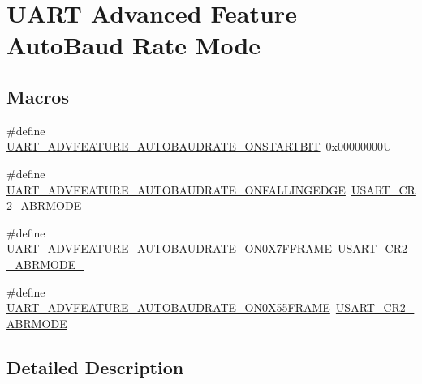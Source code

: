 \hypertarget{group___u_a_r_t___auto_baud___rate___mode}{}\section{U\+A\+RT Advanced Feature Auto\+Baud Rate Mode}
\label{group___u_a_r_t___auto_baud___rate___mode}
\subsection*{Macros}
\begin{DoxyCompactItemize}
\item 
\#define \mbox{\hyperlink{group___u_a_r_t___auto_baud___rate___mode_ga87bcd5d6ca1b354785788366c9c47606}{U\+A\+R\+T\+\_\+\+A\+D\+V\+F\+E\+A\+T\+U\+R\+E\+\_\+\+A\+U\+T\+O\+B\+A\+U\+D\+R\+A\+T\+E\+\_\+\+O\+N\+S\+T\+A\+R\+T\+B\+IT}}~0x00000000U
\item 
\#define \mbox{\hyperlink{group___u_a_r_t___auto_baud___rate___mode_ga8ac0407640f138067bdcf2ad6cdc04cc}{U\+A\+R\+T\+\_\+\+A\+D\+V\+F\+E\+A\+T\+U\+R\+E\+\_\+\+A\+U\+T\+O\+B\+A\+U\+D\+R\+A\+T\+E\+\_\+\+O\+N\+F\+A\+L\+L\+I\+N\+G\+E\+D\+GE}}~\mbox{\hyperlink{group___peripheral___registers___bits___definition_ga74a9e3740bd087f5170c58b85bc4e689}{U\+S\+A\+R\+T\+\_\+\+C\+R2\+\_\+\+A\+B\+R\+M\+O\+D\+E\+\_}}
\item 
\#define \mbox{\hyperlink{group___u_a_r_t___auto_baud___rate___mode_ga0bdbaec8f1186a4bbbdef5e09896a3e2}{U\+A\+R\+T\+\_\+\+A\+D\+V\+F\+E\+A\+T\+U\+R\+E\+\_\+\+A\+U\+T\+O\+B\+A\+U\+D\+R\+A\+T\+E\+\_\+\+O\+N0\+X7\+F\+F\+R\+A\+ME}}~\mbox{\hyperlink{group___peripheral___registers___bits___definition_gac439d0281ee2e6f20261076a50314cff}{U\+S\+A\+R\+T\+\_\+\+C\+R2\+\_\+\+A\+B\+R\+M\+O\+D\+E\+\_}}
\item 
\#define \mbox{\hyperlink{group___u_a_r_t___auto_baud___rate___mode_gaa325fa0ee642902e4746a53f9b58720d}{U\+A\+R\+T\+\_\+\+A\+D\+V\+F\+E\+A\+T\+U\+R\+E\+\_\+\+A\+U\+T\+O\+B\+A\+U\+D\+R\+A\+T\+E\+\_\+\+O\+N0\+X55\+F\+R\+A\+ME}}~\mbox{\hyperlink{group___peripheral___registers___bits___definition_ga7b0a61926b32b1bbe136944c4133d2be}{U\+S\+A\+R\+T\+\_\+\+C\+R2\+\_\+\+A\+B\+R\+M\+O\+DE}}
\end{DoxyCompactItemize}


\subsection{Detailed Description}


